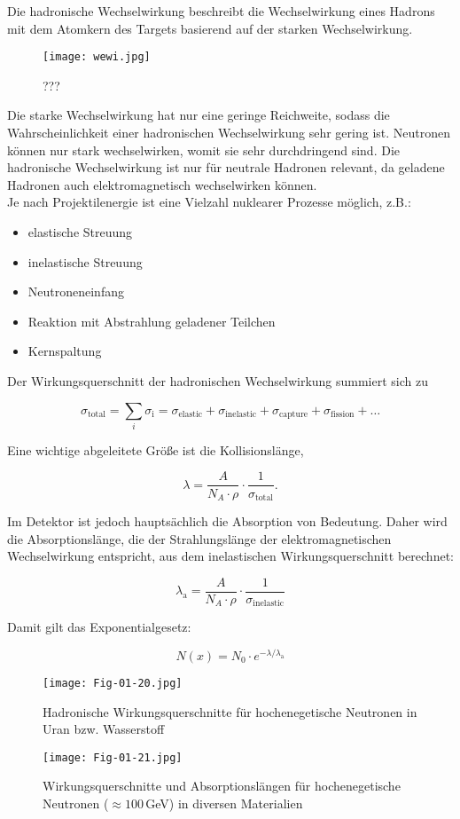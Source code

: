 Die hadronische Wechselwirkung beschreibt die Wechselwirkung eines Hadrons mit dem Atomkern des
Targets basierend auf der starken Wechselwirkung. 

\begin{figure}[H]
	\centering
	\texttt{[image: wewi.jpg]}
	\caption{	 ???}
	\label{hadrwewi}
\end{figure}

Die starke Wechselwirkung hat nur eine geringe Reichweite, sodass die Wahrscheinlichkeit einer
hadronischen Wechselwirkung sehr gering ist. Neutronen können nur stark wechselwirken, womit sie
sehr durchdringend sind. Die hadronische Wechselwirkung ist nur für neutrale Hadronen relevant, da
geladene Hadronen auch elektromagnetisch wechselwirken können. 
\\
Je nach Projektilenergie ist eine Vielzahl nuklearer Prozesse möglich, z.B.:

\begin{itemize}
  \item elastische Streuung
  \item inelastische Streuung
  \item Neutroneneinfang
  \item Reaktion mit Abstrahlung geladener Teilchen
  \item Kernspaltung
\end{itemize}

Der Wirkungsquerschnitt der hadronischen Wechselwirkung summiert sich zu

\[\sigma_\text{total} = \sum_i \sigma_\text{i} = \sigma_\text{elastic}+ \sigma_\text{inelastic}+
\sigma_\text{capture}+ \sigma_\text{fission} +\ldots\]

Eine wichtige abgeleitete Größe ist die Kollisionslänge,

\[ \lambda = \frac{A}{N_A\cdot\rho}\cdot \frac{1}{\sigma_\text{total}}. \]

Im Detektor ist jedoch hauptsächlich die Absorption von Bedeutung. Daher wird die Absorptionslänge,
die der Strahlungslänge der elektromagnetischen Wechselwirkung entspricht, aus dem inelastischen
Wirkungsquerschnitt berechnet:

\[ \lambda_\text{a} =  \frac{A}{N_A\cdot\rho}\cdot \frac{1}{\sigma_\text{inelastic}}\]

Damit gilt das Exponentialgesetz:

\[N(x) = N_0\cdot e^{-\lambda/\lambda_\text{a}} \]

 
\begin{figure}[H]
	\centering
	\texttt{[image: Fig-01-20.jpg]}
	\caption{Hadronische Wirkungsquerschnitte für hochenegetische Neutronen in Uran bzw. Wasserstoff}
	\label{hadrwewi2}
\end{figure}

\begin{figure}[H]
	\centering
	\texttt{[image: Fig-01-21.jpg]}
	\caption{Wirkungsquerschnitte und Absorptionslängen für hochenegetische Neutronen ($\approx
	100\,$GeV) in diversen Materialien}
	\label{hadrwewitab}
\end{figure}